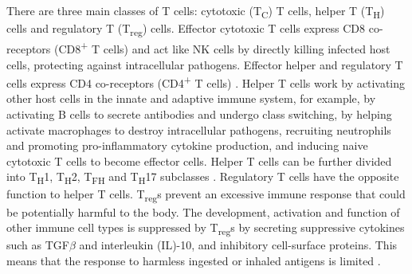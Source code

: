 There are three main classes of T cells: cytotoxic (T\textsubscript{C}) T cells, helper T (T\textsubscript{H}) cells and regulatory T (T\textsubscript{reg}) cells.
Effector cytotoxic T cells express CD8 co-receptors (CD8\textsuperscript{+} T cells) and act like NK cells by directly killing infected host cells, protecting against intracellular pathogens.
Effector helper and regulatory T cells express CD4 co-receptors (CD4\textsuperscript{+} T cells) \cite{luckheeram2012cd4}.
Helper T cells work by activating other host cells in the innate and adaptive immune system, for example, by activating B cells to secrete antibodies and undergo class switching, by helping activate macrophages to destroy intracellular pathogens, recruiting neutrophils and promoting pro-inflammatory cytokine production, and inducing naive cytotoxic T cells to become effector cells.
Helper T cells can be further divided into T\textsubscript{H}1, T\textsubscript{H}2, T\textsubscript{FH} and T\textsubscript{H}17 subclasses \cite{alberts2007molecularimmune,luckheeram2012cd4}.
Regulatory T cells have the opposite function to helper T cells.
T\textsubscript{reg}s prevent an excessive immune response that could be potentially harmful to the body.
The development, activation and function of other immune cell types is suppressed by T\textsubscript{reg}s by secreting suppressive cytokines such as TGF$\beta$ and interleukin (IL)-10, and inhibitory cell-surface proteins.
This means that the response to harmless ingested or inhaled antigens is limited \cite{alberts2007molecularimmune}.

%

